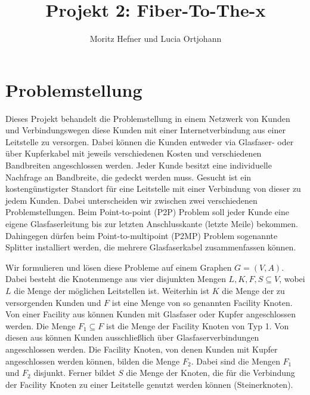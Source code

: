 \documentclass[11pt,a4paper]{article}
\title{Projekt 2: Fiber-To-The-x}
\author{Moritz Hefner und Lucia Ortjohann}
\theoremstyle{my_th_style1}
\begin{document}
\maketitle
\thispagestyle{empty}
\newpage
\tableofcontents
\thispagestyle{empty}
\newpage
\setcounter{page}{1}



\section{Problemstellung}

Dieses Projekt behandelt die Problemstellung in einem Netzwerk von Kunden und Verbindungswegen diese Kunden mit einer Internetverbindung aus einer Leitstelle zu versorgen.
Dabei k\"onnen die Kunden entweder via Glasfaser- oder \"uber Kupferkabel mit jeweils verschiedenen Kosten und verschiedenen Bandbreiten angeschlossen werden.
Jeder Kunde besitzt eine individuelle Nachfrage an Bandbreite, die gedeckt werden muss.
Gesucht ist ein kosteng\"unstigster Standort f\"ur eine Leitstelle mit einer Verbindung von dieser zu jedem Kunden.
Dabei unterscheiden wir zwischen zwei verschiedenen Problemstellungen.
Beim Point-to-point (P2P) Problem soll jeder Kunde eine eigene Glasfaserleitung bis zur letzten Anschlusskante (letzte Meile) bekommen.
Dahingegen dürfen beim Point-to-multipoint (P2MP) Problem sogenannte Splitter installiert werden, die mehrere Glasfaserkabel zusammenfassen k\"onnen.
 
Wir formulieren und lösen diese Probleme auf einem Graphen \(G=(V,A)\).
Dabei besteht die Knotenmenge aus vier disjunkten Mengen $L,K,F,S \subseteq V$, wobei $L$ die Menge der m\"oglichen Leitstellen ist. Weiterhin ist $K$ die Menge der zu versorgenden Kunden und $F$ ist eine Menge von so genannten Facility Knoten.
Von einer Facility aus können Kunden mit Glasfaser oder Kupfer angeschlossen werden.
Die Menge $F_1 \subseteq F$ ist die Menge der Facility Knoten von Typ 1.
Von diesen aus können Kunden ausschließlich über Glasfaserverbindungen angeschlossen werden.
Die Facility Knoten, von denen Kunden mit Kupfer angeschlossen werden können, bilden die Menge $F_2$. Dabei sind die Mengen $F_1$ und $F_2$ disjunkt.
Ferner bildet $S$ die Menge der Knoten, die für die Verbindung der Facility Knoten zu einer Leitstelle genutzt werden k\"onnen (Steinerknoten). 
\end{document}
